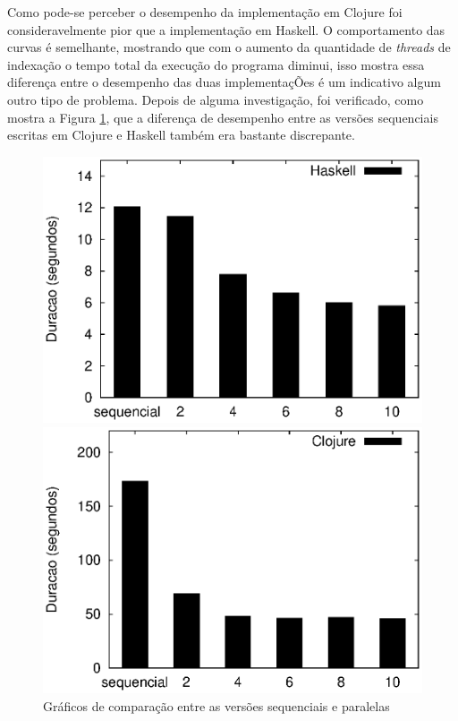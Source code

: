 Como pode-se perceber o desempenho da implementação em Clojure foi consideravelmente pior que a implementação em Haskell. O comportamento das curvas é semelhante, mostrando que com o aumento da quantidade de \emph{threads} de indexação o tempo total da execução do programa diminui, isso mostra essa diferença entre o desempenho das duas implementaçÕes é um indicativo algum outro tipo de problema. Depois de alguma investigação, foi verificado, como mostra a Figura \ref{fig:clj-hs}, que a diferença de desempenho entre as versões sequenciais escritas em Clojure e Haskell também era bastante discrepante.

\begin{figure}[!h]
 \begin{minipage}{0.5\textwidth}
  \centering
  \includegraphics[scale=0.63]{imagens/haskell.eps}
 \end{minipage}
 \begin{minipage}{0.5\textwidth}
  \includegraphics[scale=0.63]{imagens/clojure.eps}
 \end{minipage}
 \caption{Gráficos de comparação entre as versões sequenciais e paralelas}
 \label{fig:clj-hs}
\end{figure}

